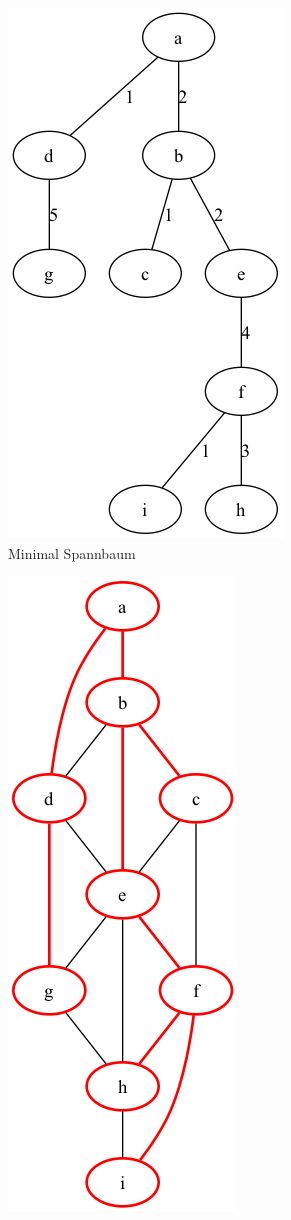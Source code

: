 \documentclass[a4paper,11pt]{report}
\begin{document}
    \begin{figure}[htbp]
        \centering
        \begin{subfigure}[b]{0.3\textwidth}
            \includegraphics[height=0.2\textheight]{a01a_mst}
            \caption{Minimal Spannbaum}
            \label{fig:a02_mst}
        \end{subfigure}
        \begin{subfigure}[b]{0.3\textwidth}
            \includegraphics[height=0.2\textheight]{a01a_graph_highlighted}

\end{subfigure}
\end{figure}
\end{document}
